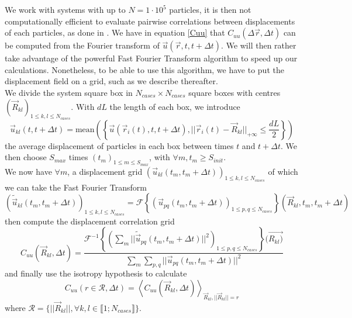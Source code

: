 \documentclass[class=report, float=false, crop=false]{standalone}
\begin{document}

We work with systems with up to $N = 1\cdot10^5$ particles, it is then not computationally efficient to evaluate pairwise correlations between displacements of each particles, as done in \cite{weeks2007short}. We have in equation \ref{Cuu} that $C_{uu}(\Delta \vec{r}, \Delta t)$ can be computed from the Fourier transform of $\vec{u}(\vec{r}, t, t + \Delta t)$. We will then rather take advantage of the powerful Fast Fourier Transform algorithm to speed up our calculations. Nonetheless, to be able to use this algorithm, we have to put the displacement field on a grid, such as we describe thereafter.\\

We divide the system square box in $N_{cases} \times N_{cases}$ square boxes with centres $(\vec{R}_{kl})_{1 \leq k, l \leq N_{cases}}$. With $dL$ the length of each box, we introduce
\begin{equation}
\vec{u}_{kl}(t, t + \Delta t) = \text{mean}\left(\left\{\vec{u}(\vec{r}_i(t), t, t + \Delta t), ||\vec{r}_i(t) - \vec{R}_{kl}||_{+\infty} \leq \frac{dL}{2}\right\}\right)
\label{u_to_grid}
\end{equation}
the average displacement of particles in each box between times $t$ and $t + \Delta t$. We then choose $S_{max}$ times $(t_m)_{1 \leq m \leq S_{max}}$, with $\forall m, t_m \geq S_{init}$.\\

We now have $\forall m$, a displacement grid $(\vec{u}_{kl}(t_m, t_m + \Delta t))_{1 \leq k, l \leq N_{cases}}$ of which we can take the Fast Fourier Transform
\begin{equation}
(\tilde{\vec{u}}_{kl}(t_m, t_m + \Delta t))_{1 \leq k, l \leq N_{cases}} = \mathcal{F}\left\{(\vec{u}_{pq}(t_m, t_m + \Delta t))_{1 \leq p, q \leq N_{cases}}\right\}(\vec{R}_{kl}, t_m, t_m + \Delta t)
\end{equation}
then compute the displacement correlation grid
\begin{equation}
C_{uu}(\vec{R}_{kl}, \Delta t) = \frac{\mathcal{F}^{-1}\left\{\left(\sum_m ||\tilde{\vec{u}}_{pq}(t_m, t_m + \Delta t)||^2\right)_{1 \leq p, q \leq N_{cases}}\right\}(\vec{R_{kl})}}{\sum_m\sum_{p, q} ||\vec{u}_{pq}(t_m, t_m + \Delta t)||^2}
\end{equation}
and finally use the isotropy hypothesis to calculate
\begin{equation}
C_{uu}(r \in \mathcal{R}, \Delta t) = \left<C_{uu}(\vec{R}_{kl}, \Delta t)\right>_{\vec{R}_{kl}, ||\vec{R}_{kl}||=r}
\end{equation}
where $\mathcal{R} = \{||\vec{R}_{kl}||, \forall k, l \in \llbracket 1 ; N_{cases} \rrbracket\}$.\\
\end{document}
